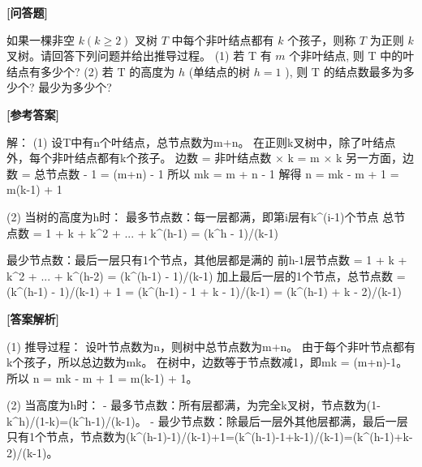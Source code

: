 \documentclass[12pt,a4paper]{article}
\newenvironment{choicequestion}[1][]{%
    \vspace{0.5cm}
    \noindent\textbf{[#1]}
    \vspace{0.2cm}
}{}
\newenvironment{answersection}{%
    \vspace{0.2cm}
    \noindent\textbf{[参考答案]}\\
    \vspace{0.1cm}
}{}
\newenvironment{analysissection}{%
    \vspace{0.2cm}
    \noindent\textbf{[答案解析]}\\
    \vspace{0.1cm}
}{}
\newcounter{questioncounter}
\newcommand{\question}[2]{%
    \stepcounter{questioncounter}%
    \noindent\textbf{\thequestioncounter} #1%
}
\begin{document}
\begin{choicequestion}[问答题]
\question{如果一棵非空 $k (k \geqslant 2)$ 叉树 $T$ 中每个非叶结点都有 $k$ 个孩子，则称 $T$ 为正则 $k$ 叉树。请回答下列问题并给出推导过程。\newline
(1) 若 T 有 $m$ 个非叶结点, 则 T 中的叶结点有多少个?  \newline
(2) 若 $\mathrm{T}$ 的高度为 $h$ (单结点的树 $h = 1$ ), 则 $\mathrm{T}$ 的结点数最多为多少个? 最少为多少个?}{}

\begin{answersection}
解：
(1) 设T中有n个叶结点，总节点数为m+n。
在正则k叉树中，除了叶结点外，每个非叶结点都有k个孩子。
边数 = 非叶结点数 × k = m × k
另一方面，边数 = 总节点数 - 1 = (m+n) - 1
所以 mk = m + n - 1
解得 n = mk - m + 1 = m(k-1) + 1

(2) 当树的高度为h时：
最多节点数：每一层都满，即第i层有k^(i-1)个节点
总节点数 = 1 + k + k^2 + ... + k^(h-1) = (k^h - 1)/(k-1)

最少节点数：最后一层只有1个节点，其他层都是满的
前h-1层节点数 = 1 + k + k^2 + ... + k^(h-2) = (k^(h-1) - 1)/(k-1)
加上最后一层的1个节点，总节点数 = (k^(h-1) - 1)/(k-1) + 1 = (k^(h-1) - 1 + k - 1)/(k-1) = (k^(h-1) + k - 2)/(k-1)
\end{answersection}

\begin{analysissection}
(1) 推导过程：
设叶节点数为n，则树中总节点数为m+n。
由于每个非叶节点都有k个孩子，所以总边数为mk。
在树中，边数等于节点数减1，即mk = (m+n)-1。
所以 n = mk - m + 1 = m(k-1) + 1。

(2) 当高度为h时：
- 最多节点数：所有层都满，为完全k叉树，节点数为(1-k^h)/(1-k)=(k^h-1)/(k-1)。
- 最少节点数：除最后一层外其他层都满，最后一层只有1个节点，节点数为(k^(h-1)-1)/(k-1)+1=(k^(h-1)-1+k-1)/(k-1)=(k^(h-1)+k-2)/(k-1)。
\end{analysissection}
\end{choicequestion}
\end{document}
